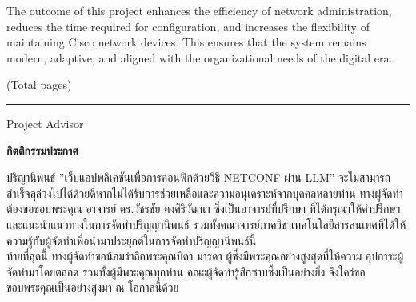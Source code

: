  \hspace*{1.3em} %
 The outcome of this project enhances the efficiency of network administration,
 reduces the time required for configuration, and increases the flexibility of maintaining
 Cisco network devices. This ensures that the system remains modern, adaptive, and
 aligned with the organizational needs of the digital era.

\begin{flushright}
(Total \pageref{LastPage} pages)

\vfill

\rule{12 cm}{0.4pt} Project Advisor

\end{flushright}


\newpage
{}
{}

\vspace*{-0.5in}



\begin{center}\textbf{กิตติกรรมประกาศ}\end{center}

\hspace*{1.3em}  %
 ปริญานิพนธ์ ”เว็บแอปพลิเคชันเพื่อการคอนฟิกด้วยวิธี NETCONF ผ่าน LLM” จะไม่สามารถ
 สำเร็จลุล่วงไปได้ด้วยดีหากไม่ได้รับการช่วยเหลือและความอนุเคราะห์จากบุคคลหลายท่าน ทางผู้จัดทำ
 ต้องขอขอบพระคุณ อาจารย์ ดร.วัชรชัย คงศิริวัฒนา ซึ่งเป็นอาจารย์ที่ปรึกษา ที่ได้กรุณาให้คำปรึกษา
 และแนะนำแนวทางในการจัดทำปริญญานิพนธ์ รวมทั้งคณาจารย์ภาควิชาเทคโนโลยีสารสนเทศที่ได้ให้
 ความรู้กับผู้จัดทำเพื่อนำมาประยุกต์ในการจัดทำปริญญานิพนธ์นี้
\\
\hspace*{1.3em}  %
ท้ายที่สุดนี้ ทางผู้จัดทำขอน้อมรำลึกพระคุณบิดา มารดา ผู้ซึ่งมีพระคุณอย่างสูงสุดที่ให้ความ
 อุปการะผู้จัดทำมาโดยตลอด รวมทั้งผู้มีพระคุณทุกท่าน คณะผู้จัดทำรู้สึกซาบซึ้งเป็นอย่างยิ่ง จึงใคร่ขอ
 ขอบพระคุณเป็นอย่างสูงมา ณ โอกาสนี้ด้วย
\\
\begin{flushright}

\end{flushright}
